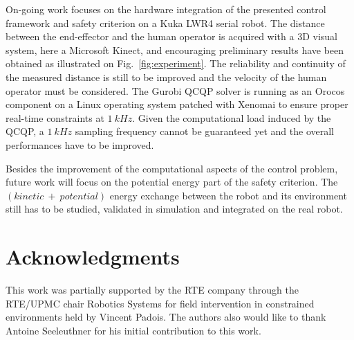 \documentclass[a4paper, 10pt, conference]{ieeeconf}      %
\begin{document}

On-going work focuses on the hardware integration of the presented control framework and safety criterion on a Kuka LWR4 serial robot. The distance between the end-effector and the human operator is acquired with a 3D visual system, here a Microsoft Kinect, and encouraging preliminary results have been obtained as illustrated on Fig.~\ref{fig:experiment}. The reliability and continuity of the measured distance is still to be improved and the velocity of the human operator must be considered. The Gurobi QCQP solver is running as an Orocos component on a Linux operating system patched with Xenomai to ensure proper real-time constraints at $1~kHz$. Given the computational load induced by the QCQP, a $1~kHz$ sampling frequency cannot be guaranteed yet and the overall performances have to be improved.  

Besides the improvement of the computational aspects of the control problem, future work  will focus  on the potential energy part of the safety criterion.  The  $(kinetic~+~potential)$ energy exchange  between the robot and its environment still has to be studied, validated in simulation and integrated on the real robot.




\section{Acknowledgments}
This work was partially supported by the RTE company through the RTE/UPMC chair Robotics Systems for field intervention in constrained environments held by Vincent Padois. The authors also would like to thank Antoine Seeleuthner for his initial contribution to this work.




\end{document}
